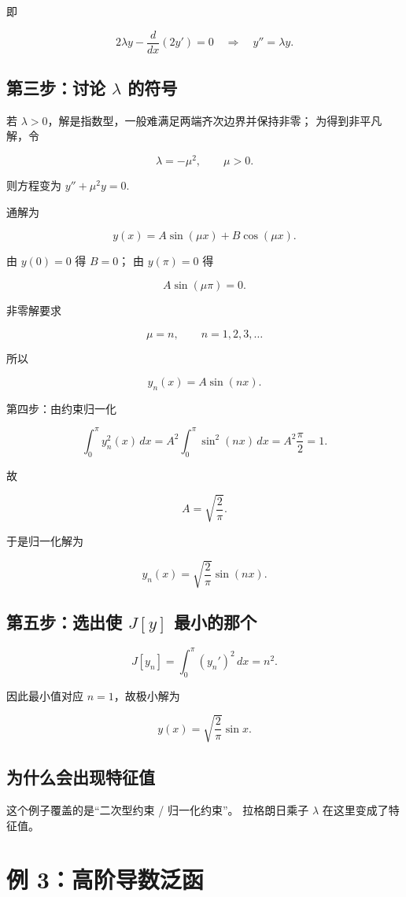 即

\[
2\lambda y-\frac{d}{dx}(2y')=0
\quad\Longrightarrow\quad
y''=\lambda y.
\]

\subsection{第三步：讨论 \(\lambda\) 的符号}

若 \(\lambda>0\)，解是指数型，一般难满足两端齐次边界并保持非零；
为得到非平凡解，令

\[
\lambda=-\mu^2,\qquad \mu>0.
\]

则方程变为 \(y''+\mu^2 y=0.\)

通解为

\[
y(x)=A\sin(\mu x)+B\cos(\mu x).
\]

由 \(y(0)=0\) 得 \(B=0\)；
由 \(y(\pi)=0\) 得

\[
A\sin(\mu\pi)=0.
\]

非零解要求

\[
\mu=n,\qquad n=1,2,3,\dots
\]

所以

\[
y_n(x)=A\sin(nx).
\]

第四步：由约束归一化

\[
\int_0^\pi y_n^2(x)\,dx
=
A^2\int_0^\pi \sin^2(nx)\,dx
=
A^2\frac{\pi}{2}
=1.
\]

故

\[
A=\sqrt{\frac{2}{\pi}}.
\]

于是归一化解为

\[
y_n(x)=\sqrt{\frac{2}{\pi}}\sin(nx).
\]

\subsection{第五步：选出使 \(J[y]\) 最小的那个}

\[
J[y_n]=\int_0^\pi (y_n')^2\,dx=n^2.
\]

因此最小值对应 \(n=1\)，故极小解为

\[
\boxed{
y(x)=\sqrt{\frac{2}{\pi}}\sin x
}.
\]

\subsection{为什么会出现特征值}

这个例子覆盖的是“二次型约束 / 归一化约束”。
拉格朗日乘子 \(\lambda\) 在这里变成了特征值。

\section{例 3：高阶导数泛函}

